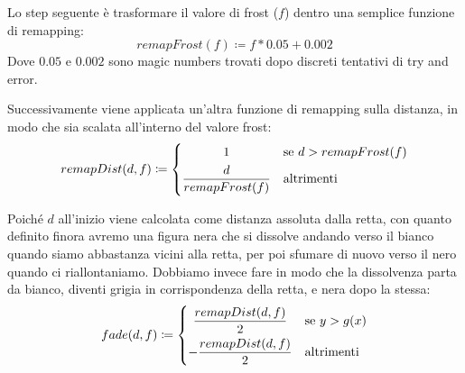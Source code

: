 \documentclass[main.tex]{subfiles}
\begin{document}
Lo step seguente è trasformare il valore di frost ($f$) dentro una semplice funzione di remapping:
\[remapFrost(f) \coloneqq f * 0.05 + 0.002\]
Dove $0.05$ e $0.002$ sono magic numbers trovati dopo discreti tentativi di try and error.

Successivamente viene applicata un'altra funzione di remapping sulla distanza, in modo che sia scalata all'interno del valore frost:
\[remapDist(d, f) \coloneqq 
	\begin{dcases}
		\hfil 1 & \text{se } d > remapFrost(f)\\
		\frac{d}{remapFrost(f)} & \text{altrimenti}
	\end{dcases}
\]

Poiché $d$ all'inizio viene calcolata come distanza assoluta dalla retta, con quanto definito finora avremo una figura nera che si dissolve andando verso il bianco quando siamo abbastanza vicini alla retta, per poi sfumare di nuovo verso il nero quando ci riallontaniamo. Dobbiamo invece fare in modo che la dissolvenza parta da bianco, diventi grigia in corrispondenza della retta, e nera dopo la stessa:
\[fade(d, f) \coloneqq 
	\begin{dcases}
		\hfil	 \frac{remapDist(d, f)}{2} & \text{se } y > g(x)\\
				-\frac{remapDist(d, f)}{2} & \text{altrimenti}
	\end{dcases}
\]
\newline
\end{document}
